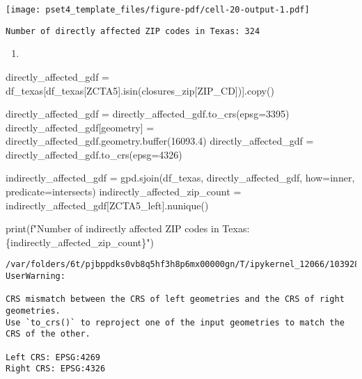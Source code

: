 \documentclass[
  letterpaper,
  DIV=11,
  numbers=noendperiod]{scrartcl}
\newenvironment{Shaded}{\begin{snugshade}}{\end{snugshade}}
\newcommand{\BuiltInTok}[1]{\textcolor[rgb]{0.00,0.23,0.31}{#1}}
\newcommand{\DecValTok}[1]{\textcolor[rgb]{0.68,0.00,0.00}{#1}}
\newcommand{\FloatTok}[1]{\textcolor[rgb]{0.68,0.00,0.00}{#1}}
\newcommand{\NormalTok}[1]{\textcolor[rgb]{0.00,0.23,0.31}{#1}}
\newcommand{\OperatorTok}[1]{\textcolor[rgb]{0.37,0.37,0.37}{#1}}
\newcommand{\SpecialCharTok}[1]{\textcolor[rgb]{0.37,0.37,0.37}{#1}}
\newcommand{\SpecialStringTok}[1]{\textcolor[rgb]{0.13,0.47,0.30}{#1}}
\newcommand{\StringTok}[1]{\textcolor[rgb]{0.13,0.47,0.30}{#1}}
\providecommand{\tightlist}{%
  \setlength{\itemsep}{0pt}\setlength{\parskip}{0pt}}\usepackage{longtable,booktabs,array}
\begin{document}
\texttt{[image: pset4\_template\_files/figure-pdf/cell-20-output-1.pdf]}

\begin{verbatim}
Number of directly affected ZIP codes in Texas: 324
\end{verbatim}

\begin{enumerate}
\def\labelenumi{\arabic{enumi}.}
\setcounter{enumi}{2}
\tightlist
\item
\end{enumerate}

\begin{Shaded}
\begin{Highlighting}[]
\NormalTok{directly\_affected\_gdf }\OperatorTok{=}\NormalTok{ df\_texas[df\_texas[}\StringTok{\textquotesingle{}ZCTA5\textquotesingle{}}\NormalTok{].isin(closures\_zip[}\StringTok{\textquotesingle{}ZIP\_CD\textquotesingle{}}\NormalTok{])].copy()}

\NormalTok{directly\_affected\_gdf }\OperatorTok{=}\NormalTok{ directly\_affected\_gdf.to\_crs(epsg}\OperatorTok{=}\DecValTok{3395}\NormalTok{)}
\NormalTok{directly\_affected\_gdf[}\StringTok{\textquotesingle{}geometry\textquotesingle{}}\NormalTok{] }\OperatorTok{=}\NormalTok{ directly\_affected\_gdf.geometry.}\BuiltInTok{buffer}\NormalTok{(}\FloatTok{16093.4}\NormalTok{)}
\NormalTok{directly\_affected\_gdf }\OperatorTok{=}\NormalTok{ directly\_affected\_gdf.to\_crs(epsg}\OperatorTok{=}\DecValTok{4326}\NormalTok{) }

\NormalTok{indirectly\_affected\_gdf }\OperatorTok{=}\NormalTok{ gpd.sjoin(df\_texas, directly\_affected\_gdf, how}\OperatorTok{=}\StringTok{\textquotesingle{}inner\textquotesingle{}}\NormalTok{, predicate}\OperatorTok{=}\StringTok{\textquotesingle{}intersects\textquotesingle{}}\NormalTok{)}
\NormalTok{indirectly\_affected\_zip\_count }\OperatorTok{=}\NormalTok{ indirectly\_affected\_gdf[}\StringTok{\textquotesingle{}ZCTA5\_left\textquotesingle{}}\NormalTok{].nunique()}

\BuiltInTok{print}\NormalTok{(}\SpecialStringTok{f"Number of indirectly affected ZIP codes in Texas: }\SpecialCharTok{\{}\NormalTok{indirectly\_affected\_zip\_count}\SpecialCharTok{\}}\SpecialStringTok{"}\NormalTok{)}
\end{Highlighting}
\end{Shaded}

\begin{verbatim}
/var/folders/6t/pjbppdks0vb8q5hf3h8p6mx00000gn/T/ipykernel_12066/1039283380.py:7: UserWarning:

CRS mismatch between the CRS of left geometries and the CRS of right geometries.
Use `to_crs()` to reproject one of the input geometries to match the CRS of the other.

Left CRS: EPSG:4269
Right CRS: EPSG:4326

\end{verbatim}
\end{document}
